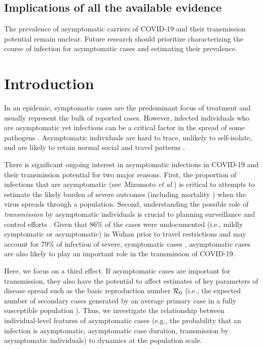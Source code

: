 \documentclass[12pt]{article}
\begin{document}
\subsection*{Implications of all the available evidence}

The prevalence of asymptomatic carriers of COVID-19 and their transmission potential remain unclear. 
Future research should prioritize characterizing the course of infection for asymptomatic cases and estimating their prevalence.

\pagebreak

\section{Introduction}

In an epidemic, symptomatic cases are the predominant focus of treatment and usually represent the bulk of reported cases. 
However, infected individuals who are asymptomatic yet infectious can be a critical factor in the spread of some pathogens \cite{fraser2004factors}.
Asymptomatic individuals are hard to trace, unlikely to self-isolate, and are likely to retain normal social and travel patterns \cite{quilty2020effectiveness}.

There is significant ongoing interest in asymptomatic infections in COVID-19 \cite{chan2020familial, pan2020asymptomatic, tangearly} and their transmission potential \cite{bai2020presumed} for two major reasons.
First, the proportion of infections that are asymptomatic (see~Mizumoto \textit{et al.}\cite{mizumoto_2020}) is critical to attempts to estimate the likely burden of severe outcomes (including mortality \cite{fauci_nejm2020}) when the virus spreads through a population.
Second, understanding the possible role of \emph{transmission} by asymptomatic individuals is crucial to planning surveillance and control efforts \cite{fraser2004factors}.
Given that 86\% of the cases were undocumented (i.e., mildly symptomatic or asymptomatic) in Wuhan prior to travel restrictions and may account for 79\% of infection of severe, symptomatic cases \cite{Lieabb3221}, asymptomatic cases are also likely to play an important role in the transmission of COVID-19.

Here, we focus on a third effect. 
If asymptomatic cases are important for transmission, they also have the potential to affect estimates of key parameters of disease spread such as the basic reproduction number ${\cal{R}}_0$ (i.e., the expected number of secondary cases generated by an average primary case in a fully susceptible population \cite{anderson1992infectious}). 
Thus, we investigate the relationship between individual-level features of asymptomatic cases (e.g., the probability that an infection is asymptomatic, asymptomatic case duration, transmission by asymptomatic individuals) to dynamics at the population scale.
\end{document}
